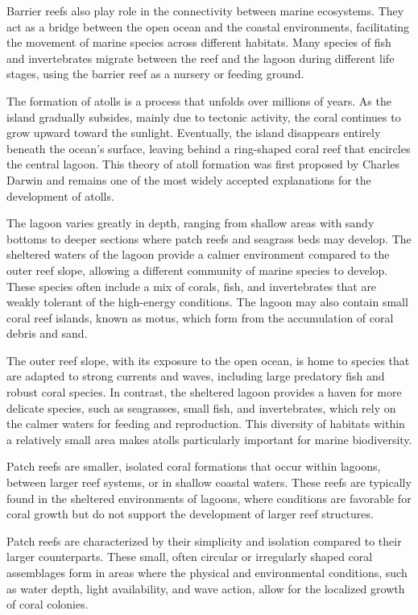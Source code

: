 Barrier reefs also play role in the connectivity between marine ecosystems. They act as a bridge between the open ocean and the coastal environments, facilitating the movement of marine species across different habitats. Many species of fish and invertebrates migrate between the reef and the lagoon during different life stages, using the barrier reef as a nursery or feeding ground.

The formation of atolls is a process that unfolds over millions of years. As the island gradually subsides, mainly due to tectonic activity, the coral continues to grow upward toward the sunlight. Eventually, the island disappears entirely beneath the ocean's surface, leaving behind a ring-shaped coral reef that encircles the central lagoon. This theory of atoll formation was first proposed by Charles Darwin and remains one of the most widely accepted explanations for the development of atolls.

The lagoon varies greatly in depth, ranging from shallow areas with sandy bottoms to deeper sections where patch reefs and seagrass beds may develop. The sheltered waters of the lagoon provide a calmer environment compared to the outer reef slope, allowing a different community of marine species to develop. These species often include a mix of corals, fish, and invertebrates that are weakly tolerant of the high-energy conditions. The lagoon may also contain small coral reef islands, known as motus, which form from the accumulation of coral debris and sand.

The outer reef slope, with its exposure to the open ocean, is home to species that are adapted to strong currents and waves, including large predatory fish and robust coral species. In contrast, the sheltered lagoon provides a haven for more delicate species, such as seagrasses, small fish, and invertebrates, which rely on the calmer waters for feeding and reproduction. This diversity of habitats within a relatively small area makes atolls particularly important for marine biodiversity.

Patch reefs are smaller, isolated coral formations that occur within lagoons, between larger reef systems, or in shallow coastal waters. These reefs are typically found in the sheltered environments of lagoons, where conditions are favorable for coral growth but do not support the development of larger reef structures.

Patch reefs are characterized by their simplicity and isolation compared to their larger counterparts. These small, often circular or irregularly shaped coral assemblages form in areas where the physical and environmental conditions, such as water depth, light availability, and wave action, allow for the localized growth of coral colonies.

